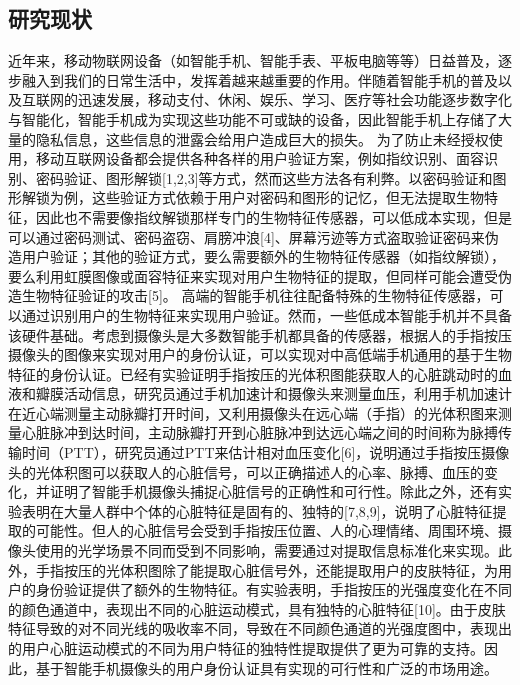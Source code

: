	\subsection{研究现状}
	{近年来，移动物联网设备（如智能手机、智能手表、平板电脑等等）日益普及，逐步融入到我们的日常生活中，发挥着越来越重要的作用。伴随着智能手机的普及以及互联网的迅速发展，移动支付、休闲、娱乐、学习、医疗等社会功能逐步数字化与智能化，智能手机成为实现这些功能不可或缺的设备，因此智能手机上存储了大量的隐私信息，这些信息的泄露会给用户造成巨大的损失。
		为了防止未经授权使用，移动互联网设备都会提供各种各样的用户验证方案，例如指纹识别、面容识别、密码验证、图形解锁[1,2,3]等方式，然而这些方法各有利弊。以密码验证和图形解锁为例，这些验证方式依赖于用户对密码和图形的记忆，但无法提取生物特征，因此也不需要像指纹解锁那样专门的生物特征传感器，可以低成本实现，但是可以通过密码测试、密码盗窃、肩膀冲浪[4]、屏幕污迹等方式盗取验证密码来伪造用户验证；其他的验证方式，要么需要额外的生物特征传感器（如指纹解锁），要么利用虹膜图像或面容特征来实现对用户生物特征的提取，但同样可能会遭受伪造生物特征验证的攻击[5]。
		高端的智能手机往往配备特殊的生物特征传感器，可以通过识别用户的生物特征来实现用户验证。然而，一些低成本智能手机并不具备该硬件基础。考虑到摄像头是大多数智能手机都具备的传感器，根据人的手指按压摄像头的图像来实现对用户的身份认证，可以实现对中高低端手机通用的基于生物特征的身份认证。已经有实验证明手指按压的光体积图能获取人的心脏跳动时的血液和瓣膜活动信息，研究员通过手机加速计和摄像头来测量血压，利用手机加速计在近心端测量主动脉瓣打开时间，又利用摄像头在远心端（手指）的光体积图来测量心脏脉冲到达时间，主动脉瓣打开到心脏脉冲到达远心端之间的时间称为脉搏传输时间（PTT），研究员通过PTT来估计相对血压变化[6]，说明通过手指按压摄像头的光体积图可以获取人的心脏信号，可以正确描述人的心率、脉搏、血压的变化，并证明了智能手机摄像头捕捉心脏信号的正确性和可行性。除此之外，还有实验表明在大量人群中个体的心脏特征是固有的、独特的[7,8,9]，说明了心脏特征提取的可能性。但人的心脏信号会受到手指按压位置、人的心理情绪、周围环境、摄像头使用的光学场景不同而受到不同影响，需要通过对提取信息标准化来实现。此外，手指按压的光体积图除了能提取心脏信号外，还能提取用户的皮肤特征，为用户的身份验证提供了额外的生物特征。有实验表明，手指按压的光强度变化在不同的颜色通道中，表现出不同的心脏运动模式，具有独特的心脏特征[10]。由于皮肤特征导致的对不同光线的吸收率不同，导致在不同颜色通道的光强度图中，表现出的用户心脏运动模式的不同为用户特征的独特性提取提供了更为可靠的支持。因此，基于智能手机摄像头的用户身份认证具有实现的可行性和广泛的市场用途。
	}






